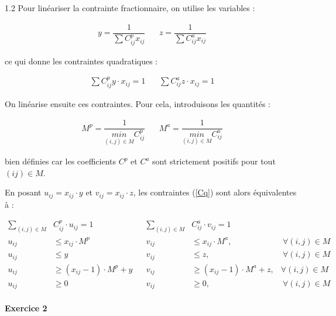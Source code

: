 \documentclass[12pt,a4paper]{article}
\begin{document}
\vspace{0.5cm}

1.2 Pour linéariser la contrainte fractionnaire, on utilise les variables :

\begin{align*}
y=\dfrac{1}{\sum C_{ij}^p x_{ij}} \ \ & \ \  z =\dfrac{1}{\sum C_{ij}^a x_{ij}}
\end{align*}

ce qui donne les contraintes quadratiques :

\begin{align} \label{Cq}
 \sum C_{ij}^p y \cdot x_{ij} = 1 \ \ & \ \   \sum C_{ij}^a z \cdot x_{ij} = 1
\end{align}

On linéarise ensuite ces contraintes. Pour cela, introduisons les quantités :

\begin{align*}
M^{p} = \dfrac{1}{\underset{(i,j) \in M }{min} C_{ij}^p} \ \ & \ \ M^{a} = \dfrac{1}{\underset{(i,j) \in M }{min} C_{ij}^a} 
\end{align*}

bien définies car les coefficients $C^p $ et $C^a$ sont strictement positifs pour tout $(ij) \in M$.

En posant $u_{ij} = x_{ij} \cdot y$ et $v_{ij} = x_{ij} \cdot z$, les contraintes (\ref{Cq}) sont alors équivalentes à :

\begin{align} \label{Clin}
\sum_{(i,j) \in M} & C^p_{ij}\cdot u_{ij} =1 \ \ & \ \ \sum_{(i,j) \in M} & C^a_{ij}\cdot v_{ij} =1 \  & \\
u_{ij} & \leq x_{ij} \cdot M^p \ \ & \ \  v_{ij} &\leq x_{ij} \cdot M^a, &\ \forall (i,j) \in M  \\
u_{ij} & \leq y  \ \ & \ \  v_{ij} & \leq z, &\ \forall (i,j) \in M  \\
u_{ij} & \geq (x_{ij}-1) \cdot M^p +y\ \ & \ \ v_{ij} & \geq (x_{ij}-1) \cdot M^a +z, & \forall (i,j) \in M \\
u_{ij} & \geq 0 \ \ & \ \  v_{ij} & \geq 0, &\ \forall (i,j) \in M  
\end{align}

\vspace{1cm}


\paragraph{Exercice 2\\}
\end{document}
